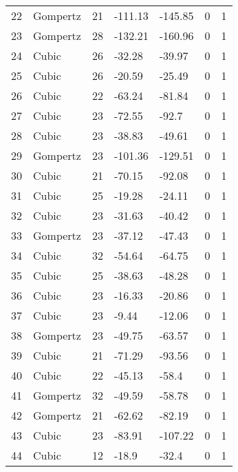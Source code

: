 \documentclass[11pt]{article}
\begin{document}
\begin{center}
\begin{longtable}{lllllll}
    22  & Gompertz  & 21              & -111.13 & -145.85 & 0       & 1    \\
    23  & Gompertz  & 28              & -132.21 & -160.96 & 0       & 1    \\
    24  & Cubic     & 26              & -32.28  & -39.97  & 0       & 1    \\
    25  & Cubic     & 26              & -20.59  & -25.49  & 0       & 1    \\
    26  & Cubic     & 22              & -63.24  & -81.84  & 0       & 1    \\
    27  & Cubic     & 23              & -72.55  & -92.7   & 0       & 1    \\
    28  & Cubic     & 23              & -38.83  & -49.61  & 0       & 1    \\
    29  & Gompertz  & 23              & -101.36 & -129.51 & 0       & 1    \\
    30  & Cubic     & 21              & -70.15  & -92.08  & 0       & 1    \\
    31  & Cubic     & 25              & -19.28  & -24.11  & 0       & 1    \\
    32  & Cubic     & 23              & -31.63  & -40.42  & 0       & 1    \\
    33  & Gompertz  & 23              & -37.12  & -47.43  & 0       & 1    \\
    34  & Cubic     & 32              & -54.64  & -64.75  & 0       & 1    \\
    35  & Cubic     & 25              & -38.63  & -48.28  & 0       & 1    \\
    36  & Cubic     & 23              & -16.33  & -20.86  & 0       & 1    \\
    37  & Cubic     & 23              & -9.44   & -12.06  & 0       & 1    \\
    38  & Gompertz  & 23              & -49.75  & -63.57  & 0       & 1    \\
    39  & Cubic     & 21              & -71.29  & -93.56  & 0       & 1    \\
    40  & Cubic     & 22              & -45.13  & -58.4   & 0       & 1    \\
    41  & Gompertz  & 32              & -49.59  & -58.78  & 0       & 1    \\
    42  & Gompertz  & 21              & -62.62  & -82.19  & 0       & 1    \\
    43  & Cubic     & 23              & -83.91  & -107.22 & 0       & 1    \\
    44  & Cubic     & 12              & -18.9   & -32.4   & 0       & 1    \\

\end{longtable}
\end{center}
\end{document}
